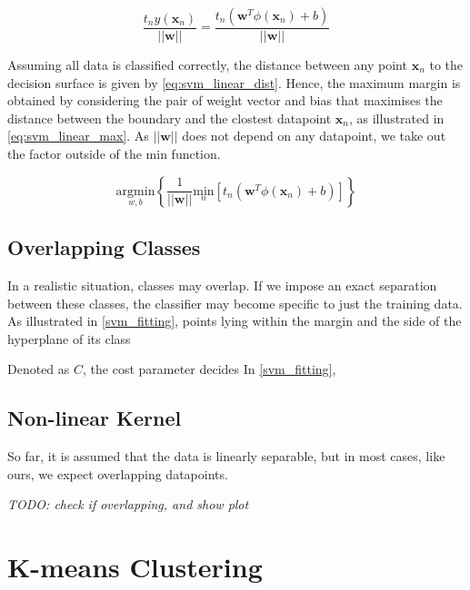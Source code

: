 \documentclass[dissertation.tex]{subfiles}
\begin{document}
\begin{equation} \label{eq:svm_linear_dist}
  \frac{t_n y(\mathbf{x}_n)}{||\mathbf{w}||} = \frac{t_n (\mathbf{w}^T \phi(\mathbf{x}_n) + b)}{||\mathbf{w}||}
\end{equation}

Assuming all data is classified correctly, the distance between any point $\mathbf{x}_n$ to the decision surface is given by \autoref{eq:svm_linear_dist}. Hence, the maximum margin is obtained by considering the pair of weight vector and bias that maximises the distance between the boundary and the clostest datapoint $\mathbf{x}_n$, as illustrated in \autoref{eq:svm_linear_max}. As $||\mathbf{w}||$ does not depend on any datapoint, we take out the factor outside of the $\mathrm{min}$ function. 

\begin{equation} \label{eq:svm_linear_max}
  \underset{w,b}{\mathrm{argmin}} \left \{ \frac{1}{||\mathbf{w}||} \underset{n}{\mathrm{min}} \left [ t_n \left (\mathbf{w}^T \phi \left (\mathbf{x}_n \right) + b \right) \right ] \right \} 
\end{equation}

\subsection{Overlapping Classes}
In a realistic situation, classes may overlap. If we impose an exact separation between these classes, the classifier may become specific to just the training data. As illustrated in \autoref{svm_fitting}, points lying within the margin and the side of the hyperplane of its class


Denoted as $C$, the cost parameter decides 
In \autoref{svm_fitting},

\subsection{Non-linear Kernel}
So far, it is assumed that the data is linearly separable, but in most cases, like ours, we expect overlapping datapoints. 

\textit{TODO: check if overlapping, and show plot}



\section{K-means Clustering}
\end{document}
